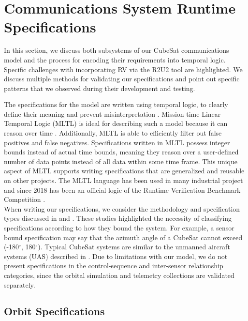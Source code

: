 \documentclass[conf]{new-aiaa}
\begin{document}
\section{Communications System Runtime Specifications}  \label{CSRS}

In this section, we discuss both subsystems of our CubeSat communications model and the process for encoding their requirements into temporal logic. Specific challenges with incorporating RV via the R2U2 tool are highlighted. We discuss multiple methods for validating our specifications and point out specific patterns that we observed during their development and testing.

The specifications for the model are written using temporal logic, to clearly define their meaning and prevent misinterpretation \cite{Roz16}. Mission-time Linear Temporal Logic (MLTL) is ideal for describing such a model because it can reason over time \cite{RRS14,LVR19,LR18}. Additionally, MLTL is able to efficiently filter out false positives and false negatives. Specifications written in MLTL possess integer bounds instead of actual time bounds, meaning they reason over a user-defined number of data points instead of all data within some time frame. This unique aspect of MLTL supports writing specifications that are generalized and reusable on other projects. The MLTL language has been used in many industrial project and since 2018 has been an official logic of the Runtime Verification Benchmark Competition \cite{RRS14,GRS14,SRRMMI15,RSI15,SMR15,SMR16,MRS17,RVBC2018}.\\

When writing our specifications, we consider the methodology and specification types discussed in \cite{Roz16} and \cite{Cauwels2020}. These studies highlighted the necessity of classifying specifications according to how they bound the system. For example, a sensor bound specification may say that the azimuth angle of a CubeSat cannot exceed (-180$^{\circ}$, 180$^{\circ}$). Typical CubeSat systems are similar to the unmanned aircraft systems (UAS) described in \cite{Cauwels2020}. Due to limitations with our model, we do not present specifications in the control-sequence and inter-sensor relationship categories, since the orbital simulation and telemetry collections are validated separately.

\subsection{Orbit Specifications}
\end{document}
